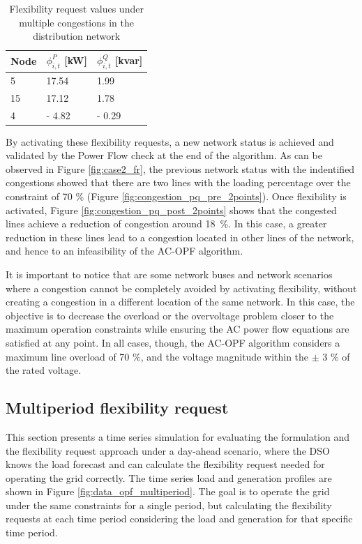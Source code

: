 \begin{table}[htbp]
\centering
\caption{Flexibility request values under multiple congestions in the distribution network}
\label{tab:FR_case2}
\begin{tabular}{lll} 
\toprule
Node & $\phi_{i,t}^{P}$ [kW] & $\phi_{i,t}^{Q}$ [kvar]  \\ 
\hline
5    & 17.54      & 1.99         \\
15    & 17.12      & 1.78          \\
4    & - 4.82      & - 0.29         \\
\bottomrule
\end{tabular}
\end{table}

By activating these flexibility requests, a new network status is achieved and validated by the Power Flow check at the end of the algorithm. As can be observed in Figure \ref{fig:case2_fr}, the previous network status with the indentified congestions showed that there are two lines with the loading percentage over the constraint of 70 \% (Figure \ref{fig:congestion_pq_pre_2points}). Once flexibility is activated, Figure \ref{fig:congestion_pq_post_2points} shows that the congested lines achieve a reduction of congestion around 18~\%. In this case, a greater reduction in these lines lead to a congestion located in other lines of the network, and hence to an infeasibility of the AC-OPF algorithm. 


It is important to notice that are some network buses and network scenarios where a congestion cannot be completely avoided by activating flexibility, without creating a congestion in a different location of the same network. In this case, the objective is to decrease the overload or the overvoltage problem closer to the maximum operation constraints while ensuring the AC power flow equations are satisfied at any point. In all cases, though, the AC-OPF algorithm considers a maximum line overload of 70 \%, and the voltage magnitude within the $\pm$ 3 \% of the rated voltage. 

\subsection{Multiperiod flexibility request}
This section presents a time series simulation for evaluating the formulation and the flexibility request approach under a day-ahead scenario, where the DSO knows the load forecast and can calculate the flexibility request needed for operating the grid correctly. The time series load and generation profiles are shown in Figure \ref{fig:data_opf_multiperiod}. The goal is to operate the grid under the same constraints for a single period, but calculating the flexibility requests at each time period considering the load and generation for that specific time period. 

